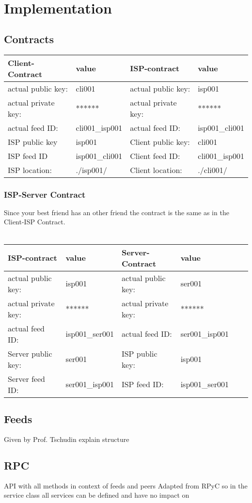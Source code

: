 \chapter{Implementation}
\section{Contracts}
\begin{tabular}{llll} \toprule
    Client-Contract&value&ISP-contract&value\\ \midrule
    actual public key:& cli001 &  actual public key: &isp001  \\ 
    actual private key:& ****** & actual private key:& ****** \\
    actual feed ID:& cli001\_isp001 &actual feed ID:&isp001\_cli001 \\ 
    ISP public key&isp001&Client public key:&cli001\\
    ISP feed ID&isp001\_cli001&Client feed ID:&cli001\_isp001\\
    ISP location:&.\slash isp001\slash &Client location:& .\slash cli001\slash \\\bottomrule
\end{tabular}
\subsection{ISP-Server Contract}
Since your best friend has an other friend the contract is the same as in the Client-ISP Contract.\\\\
\begin{tabular}{llllll} \toprule
    ISP-contract&value&Server-Contract&value\\ \midrule
    actual public key:& isp001 &  actual public key: &ser001   \\ 
    actual private key:& ****** & actual private key:& ******  \\
    actual feed ID:& isp001\_ser001 &actual feed ID:&ser001\_isp001\\ 
    Server public key:&ser001&ISP public key:&isp001\\
    Server feed ID:&ser001\_isp001&ISP feed ID:&isp001\_ser001\\\bottomrule
\end{tabular}
\section{Feeds}
Given by Prof. Tschudin explain structure
\section{RPC}
API with all methods in context of feeds and peers
Adapted from RPyC so in the service class all services can be defined and have no impact on
